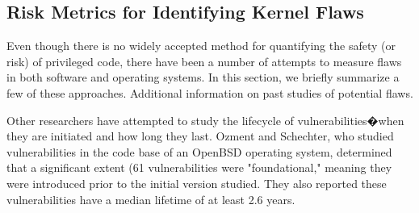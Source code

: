 








\subsection{Risk Metrics for Identifying Kernel Flaws}

Even though there is no widely accepted method for
quantifying the safety (or risk) of privileged code, there have been a number of
attempts to measure flaws in both software and operating systems. In this section,
we briefly summarize a few of these approaches. Additional information on
past studies of potential flaws.



Other researchers have attempted to study the lifecycle of vulnerabilities�when they are
initiated and how long they last. Ozment and Schechter, who studied
vulnerabilities in the code base of an OpenBSD
operating system, determined that a significant extent (61%
vulnerabilities were "foundational," meaning they were introduced prior to the
initial version studied. They also reported these vulnerabilities
have a median lifetime of at least 2.6 years.

